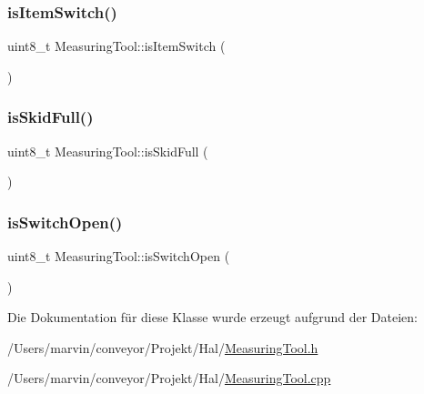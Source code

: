 \subsubsection{\texorpdfstring{is\+Item\+Switch()}{isItemSwitch()}}
{\footnotesize\ttfamily uint8\+\_\+t Measuring\+Tool\+::is\+Item\+Switch (\begin{DoxyParamCaption}{ }\end{DoxyParamCaption})}

\hypertarget{class_measuring_tool_a33ece6093e5b77f9353f86d2d9be64f6}{}\label{class_measuring_tool_a33ece6093e5b77f9353f86d2d9be64f6} 
\subsubsection{\texorpdfstring{is\+Skid\+Full()}{isSkidFull()}}
{\footnotesize\ttfamily uint8\+\_\+t Measuring\+Tool\+::is\+Skid\+Full (\begin{DoxyParamCaption}{ }\end{DoxyParamCaption})}

\hypertarget{class_measuring_tool_ad46b12c36f63fa9b597b1df6468d6aac}{}\label{class_measuring_tool_ad46b12c36f63fa9b597b1df6468d6aac} 
\subsubsection{\texorpdfstring{is\+Switch\+Open()}{isSwitchOpen()}}
{\footnotesize\ttfamily uint8\+\_\+t Measuring\+Tool\+::is\+Switch\+Open (\begin{DoxyParamCaption}{ }\end{DoxyParamCaption})}



Die Dokumentation für diese Klasse wurde erzeugt aufgrund der Dateien\+:\begin{DoxyCompactItemize}
\item 
/\+Users/marvin/conveyor/\+Projekt/\+Hal/\hyperlink{_measuring_tool_8h}{Measuring\+Tool.\+h}\item 
/\+Users/marvin/conveyor/\+Projekt/\+Hal/\hyperlink{_measuring_tool_8cpp}{Measuring\+Tool.\+cpp}\end{DoxyCompactItemize}
